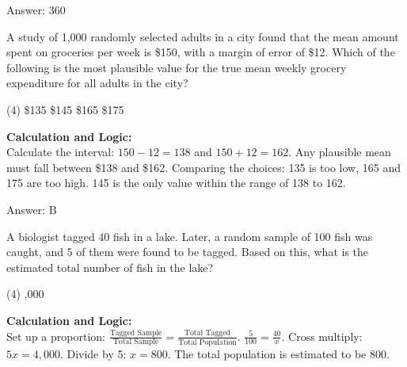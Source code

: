 \documentclass[11pt,paper=a4,answers]{exam}
\begin{document}
\begin{questions}
\begin{solution}
\vspace{30pt}

Answer: \colorbox{yellow!100}{360}
\end{solution}

\vspace{60pt}

\question
A study of 1,000 randomly selected adults in a city found that the mean amount spent on groceries per week is \$150, with a margin of error of \$12. Which of the following is the most plausible value for the true mean weekly grocery expenditure for all adults in the city?
\begin{tasks}(4)
    \task \$135
    \task \$145
    \task \$165
    \task \$175
\end{tasks}

\begin{solution}
\textbf{Calculation and Logic:} \\
Calculate the interval: $150 - 12 = 138$ and $150 + 12 = 162$. Any plausible mean must fall between \$138 and \$162. Comparing the choices: 135 is too low, 165 and 175 are too high. 145 is the only value within the range of 138 to 162.

\vspace{30pt}

Answer: \colorbox{yellow!100}{B}
\end{solution}

\vspace{60pt}

\question
A biologist tagged 40 fish in a lake. Later, a random sample of 100 fish was caught, and 5 of them were found to be tagged. Based on this, what is the estimated total number of fish in the lake?
\begin{tasks}(4)
    ,000
\end{tasks}

\begin{solution}
\textbf{Calculation and Logic:} \\
Set up a proportion: $\frac{\text{Tagged Sample}}{\text{Total Sample}} = \frac{\text{Total Tagged}}{\text{Total Population}}$. $\frac{5}{100} = \frac{40}{x}$. Cross multiply: $5x = 4,000$. Divide by 5: $x = 800$. The total population is estimated to be 800.

\vspace{30pt}


\end{solution}
\end{questions}
\end{document}
